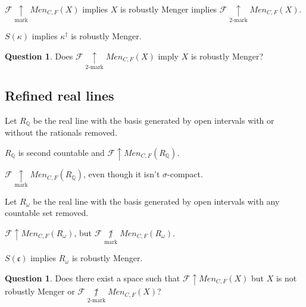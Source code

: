 \documentclass{beamer}
\theoremstyle{example}
\theoremstyle{definition}
\newtheorem{question}[theorem]{Question}
\newcommand{\win}{\uparrow}
\newcommand{\markwin}{\underset{\text{mark}}{\uparrow}}
\newcommand{\kmarkwin}[1]{\underset{#1\text{-mark}}{\uparrow}}
\newcommand{\notmarkwin}{\underset{\text{mark}}{\not\uparrow}}
\newcommand{\notkmarkwin}[1]{\underset{#1\text{-mark}}{\not\uparrow}}
\newcommand{\oneptlind}[1]{#1^\dagger} %
\newcommand{\menGame}[1]{Men_{C,F}\left({#1}\right)}
\newcommand{\<}{\langle}
\renewcommand{\>}{\rangle}
\newcommand{\mb}[1]{\mathbb{#1}}
\newcommand{\alcompS}[1]{S(#1)}
\newcommand{\pl}[1]{\mathscr{#1}}
\begin{document}
\begin{frame}
  \begin{theorem}
    \(\pl F\markwin\menGame{X}\) implies
    \(X\) is robustly Menger implies
    \(\pl F\kmarkwin{2}\menGame{X}\).
  \end{theorem}

  \pause

  \begin{theorem}
    $\alcompS\kappa$ implies $\oneptlind\kappa$ is robustly Menger.
  \end{theorem}

  \pause

  \begin{question}
    Does \(\pl F\kmarkwin{2}\menGame{X}\) imply
    \(X\) is robustly Menger?
  \end{question}
\end{frame}

\subsection{Refined real lines}

\begin{frame}
  \begin{example}
    Let \(R_{\mb Q}\) be the real line with the basis generated by
    open intervals with or without the rationals removed.
  \end{example}

  \pause

  \begin{theorem}
    \(R_{\mb Q}\) is second countable and
    \(\pl F\win\menGame{R_{\mb Q}}\).
  \end{theorem}

  \begin{corollary}
    \(\pl F\markwin\menGame{R_{\mb Q}}\), even though it isn't
    \(\sigma\)-compact.
  \end{corollary}
\end{frame}

\begin{frame}
  \begin{example}
    Let \(R_{\omega}\) be the real line with the basis generated by
    open intervals with any countable set removed.
  \end{example}

  \pause

  \begin{theorem}
    \(\pl F\win\menGame{R_\omega}\), but
    \(\pl F\notmarkwin\menGame{R_\omega}\).
  \end{theorem}

  \pause

  \begin{theorem}
    \(\alcompS{\mathfrak c}\) implies \(R_\omega\) is robustly Menger.
  \end{theorem}

  \pause

  \begin{question}
    Does there exist a space such that \(\pl F\win\menGame{X}\)
    but \(X\) is not robustly Menger or \(\pl F\notkmarkwin{2}\menGame{X}\)?
  \end{question}
\end{frame}
\end{document}
